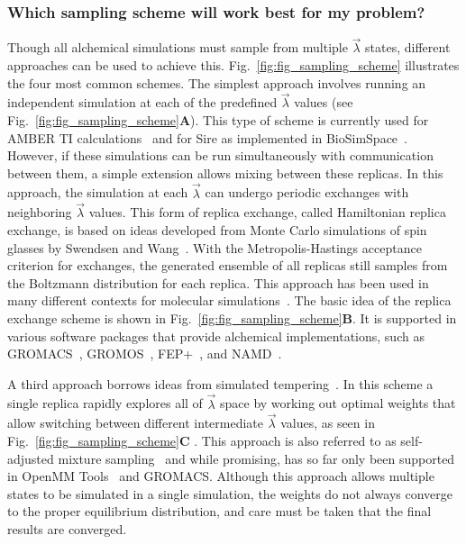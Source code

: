 \documentclass[9pt,bestpractices,pubversion]{livecoms}
\begin{document}
\subsubsection{Which sampling scheme will work best for my problem?}
\label{sec:sampling_schemes}
Though all alchemical simulations must sample from multiple $\vec{\lambda}$ states, different approaches can be used to achieve this. Fig.~\ref{fig:fig_sampling_scheme} illustrates the four most common schemes. The simplest approach involves running an independent simulation at each of the predefined $\vec{\lambda}$ values (see Fig.~\ref{fig:fig_sampling_scheme}\textbf{A}). This type of scheme is currently used for AMBER TI calculations~\cite{song2019using} and for Sire as implemented in BioSimSpace~\cite{hedges2019biosimspace}. However, if these simulations can be run simultaneously with communication between them, a simple extension allows mixing between these replicas. In this approach, the simulation at each $\vec{\lambda}$ can undergo periodic exchanges with neighboring $\vec{\lambda}$ values. This form of replica exchange, called Hamiltonian replica exchange, is based on ideas developed from Monte Carlo simulations of spin glasses by Swendsen and Wang~\cite{swendsen1986replica}. With the Metropolis-Hastings acceptance criterion for exchanges, the generated ensemble of all replicas still samples from the Boltzmann distribution for each replica. This approach has been used in many different contexts for molecular simulations~\cite{sugita2000multidimensional,sugita1999replicaexchange, woods2003development, jiang2010free}. The basic idea of the replica exchange scheme is shown in Fig.~\ref{fig:fig_sampling_scheme}\textbf{B}. It is supported in various software packages that provide alchemical implementations, such as GROMACS~\cite{aldeghi2015accurate}, GROMOS~\cite{hritz2008hamiltonian,hritz2007optimization}, FEP+~\cite{wang2015accurate}, and NAMD~\cite{jiang2019computing}. 

A third approach borrows ideas from simulated tempering~\cite{marinari1992simulated}. In this scheme a single replica rapidly explores all of $\vec{\lambda}$ space by working out optimal weights that allow switching between different intermediate $\vec{\lambda}$ values, as seen in Fig.~\ref{fig:fig_sampling_scheme}\textbf{C} . This approach is also referred to as self-adjusted mixture sampling~\cite{lyubartsev1992new, li2007simulated, tan2017optimally} and while promising, has so far only been supported in OpenMM Tools~\cite{andrearizzi2019choderalab} and GROMACS.  Although this approach allows multiple states to be simulated in a single simulation, the weights do not always converge to the proper equilibrium distribution, and care must be taken that the final results are converged. 
\end{document}
